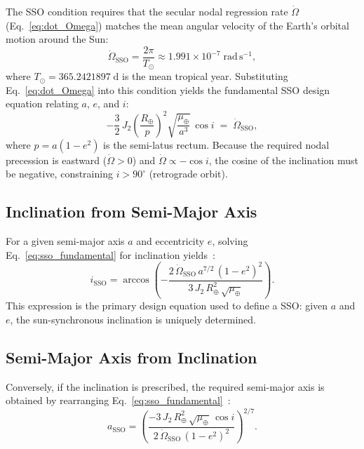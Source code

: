 The SSO condition requires that the secular nodal regression rate $\dot{\Omega}$ (Eq.~\eqref{eq:dot_Omega}) matches the mean angular velocity of the Earth's orbital motion around the Sun:
\begin{equation}
    \dot{\Omega}_{\mathrm{SSO}} = \frac{2\pi}{T_{\odot}} \approx 1.991 \times 10^{-7}\;\mathrm{rad\,s^{-1}},
    \label{eq:sso_omega_dot}
\end{equation}
where $T_{\odot} = 365.2421897\;\mathrm{d}$ is the mean tropical year.  Substituting Eq.~\eqref{eq:dot_Omega} into this condition yields the fundamental SSO design equation relating $a$, $e$, and $i$:
\begin{equation}
    -\frac{3}{2}\,J_2 \left(\frac{R_{\oplus}}{p}\right)^{\!2} \sqrt{\frac{\mu_{\oplus}}{a^3}}\,\cos i \;=\; \dot{\Omega}_{\mathrm{SSO}},
    \label{eq:sso_fundamental}
\end{equation}
where $p = a(1 - e^2)$ is the semi-latus rectum.  Because the required nodal precession is eastward ($\dot{\Omega} > 0$) and $\dot{\Omega} \propto -\cos i$, the cosine of the inclination must be negative, constraining $i > 90^{\circ}$ (retrograde orbit).

\subsection{Inclination from Semi-Major Axis}
\label{sec:sso_inc_from_a}

For a given semi-major axis $a$ and eccentricity $e$, solving Eq.~\eqref{eq:sso_fundamental} for inclination yields~\cite[Eq.~11-15]{valladoFundamentalsAstrodynamicsApplications2001}:
\begin{equation}
    i_{\mathrm{SSO}} = \arccos\!\left(-\frac{2\,\dot{\Omega}_{\mathrm{SSO}}\,a^{7/2}\,(1 - e^2)^2}{3\,J_2\,R_{\oplus}^2\,\sqrt{\mu_{\oplus}}}\right).
    \label{eq:sso_inclination}
\end{equation}
This expression is the primary design equation used to define a SSO: given $a$ and $e$, the sun-synchronous inclination is uniquely determined.

\subsection{Semi-Major Axis from Inclination}
\label{sec:sso_a_from_inc}

Conversely, if the inclination is prescribed, the required semi-major axis is obtained by rearranging Eq.~\eqref{eq:sso_fundamental}~\cite[Eq.~11-14]{valladoFundamentalsAstrodynamicsApplications2001}:
\begin{equation}
    a_{\mathrm{SSO}} = \left(\frac{-3\,J_2\,R_{\oplus}^2\,\sqrt{\mu_{\oplus}}\,\cos i}{2\,\dot{\Omega}_{\mathrm{SSO}}\,(1 - e^2)^2}\right)^{\!2/7}.
    \label{eq:sso_sma}
\end{equation}

